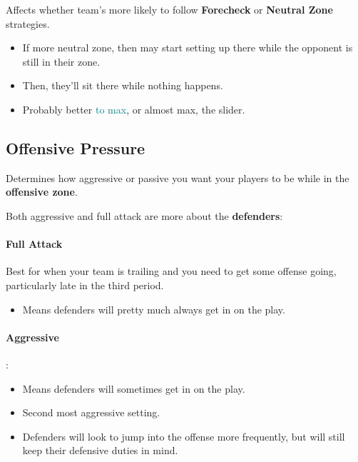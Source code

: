 \documentclass[10pt, french]{article}
\begin{document}
\begin{multicols*}{2}
\begin{minipage}{0.6\columnwidth}
\begin{tikzpicture}[x=0.75pt,y=0.75pt,yscale=-1,xscale=1]
\end{tikzpicture}

\end{minipage}

\begin{distributions}
Affects whether team's more likely to follow \textbf{Forecheck} or \textbf{Neutral Zone} strategies.
\begin{itemize}
	\item	If more neutral zone, then may start setting up there while the opponent is still in their zone.
	\item	Then, they'll sit there while nothing happens.
	\item	Probably better \textcolor{teal}{to max}, or almost max, the slider.
\end{itemize}
\end{distributions}

\subsection*{Offensive Pressure}
Determines how aggressive or passive you want your players to be while in the \textbf{offensive zone}.

Both aggressive and full attack are more about the \textbf{defenders}:

\paragraph{Full Attack} Best for when your team is trailing and you need to get some offense going, particularly late in the third period.

\begin{itemize}[leftmargin = *]
	\item	Means defenders will pretty much always get in on the play.
\end{itemize}

\paragraph{Aggressive}: 

\begin{itemize}[leftmargin = *]
	\item	Means defenders will sometimes get in on the play.
	\item	Second most aggressive setting.
	\item	Defenders will look to jump into the offense more frequently, but will still keep their defensive duties in mind.
\end{itemize}


\end{multicols*}
\end{document}
